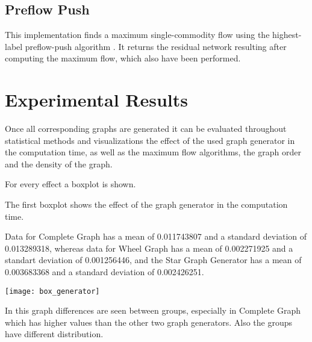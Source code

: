 \documentclass[10pt,a4paper,openany]{article}
\begin{document}
	
	
	
	
	\subsection*{Preflow Push}
	This implementation finds a maximum single-commodity flow using the highest-label preflow-push algorithm \citep{networkx} .
	It returns the residual network resulting after computing the maximum flow, which also have been performed.
	
	
	
	
	
	
	
	
	\section*{Experimental Results}	
	Once all corresponding graphs are generated it can be evaluated throughout statistical methods and visualizations the effect of the used graph generator in the computation time, as well as the maximum flow algorithms, the graph order and the density of the graph.
	
	For every effect a boxplot is shown.
	
	The first boxplot shows the effect of the graph generator in the computation time.
	
	Data for Complete Graph has a mean of 0.011743807 and a standard deviation of 0.013289318, whereas data for Wheel Graph has a mean of 0.002271925 and a standart deviation of 0.001256446, and the Star Graph Generator has a mean of 0.003683368 and a standard deviation of 0.002426251.	
	
	\begin{center}
		\texttt{[image: box\_generator]}
	\end{center}

	In this graph differences are seen between groups, especially in Complete Graph which has higher values than the other two graph generators. Also the groups have different distribution. 
	
\newpage
	
\end{document}
